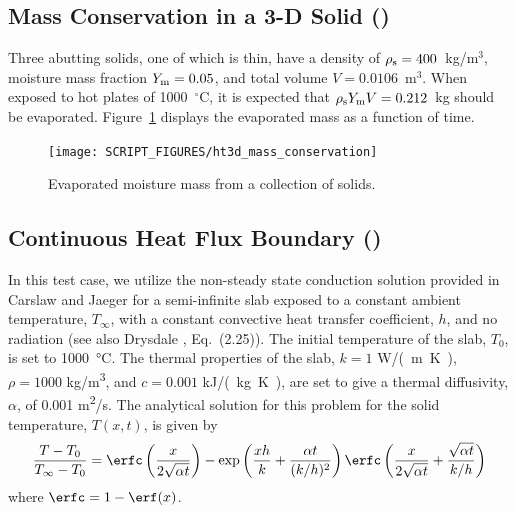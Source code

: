 \documentclass[11pt]{book}
\begin{document}
\FloatBarrier


\subsection{Mass Conservation in a 3-D Solid (\texorpdfstring{}{ht3d\_mass\_conservation})}
\label{ht3d_mass_conservation}

Three abutting solids, one of which is thin, have a density of $\rho_{\rm s}=400$~kg/m$^3$, moisture mass fraction $Y_{\rm m}=0.05$, and total volume $V=0.0106$~m$^3$. When exposed to hot plates of 1000~$^\circ$C, it is expected that $\rho_{\rm s} Y_{\rm m} V=0.212$~kg should be evaporated. Figure~\ref{fig:ht3d_mass_conservation} displays the evaporated mass as a function of time.

\begin{figure}[ht]
\centering
\texttt{[image: SCRIPT\_FIGURES/ht3d\_mass\_conservation]}
\caption[The  test case]{Evaporated moisture mass from a collection of solids.}
\label{fig:ht3d_mass_conservation}
\end{figure}

\FloatBarrier


\subsection{Continuous Heat Flux Boundary (\texorpdfstring{}{ht3d\_slab})}
\label{ht3d_slab}

In this test case, we utilize the non-steady state conduction solution provided in Carslaw and Jaeger \cite{Carslaw:1} for a semi-infinite slab exposed to a constant ambient temperature, $T_\infty$, with a constant convective heat transfer coefficient, $h$, and no radiation (see also Drysdale \cite{Drysdale:1}, Eq.~(2.25)).  The initial temperature of the slab, $T_0$, is set to \SI{1000}{\degreeCelsius}. The thermal properties of the slab, $k=1$ \si{W/(m.K)}, $\rho=1000$ \si{kg/m^3}, and $c=0.001$ \si{kJ/(kg.K)}, are set to give a thermal diffusivity, $\alpha$, of 0.001 \si{m^2/s}. The analytical solution for this problem for the solid temperature, $T(x,t)$, is given by
\begin{equation}
\label{eq:semiinfslab}
\frac{T - T_0}{T_\infty - T_0} = \erfc\left(\frac{x}{2\sqrt{\alpha t}}\right) - \exp\left( \frac{xh}{k} + \frac{\alpha t}{(k/h)^2} \right) \erfc\left( \frac{x}{2\sqrt{\alpha t}} + \frac{\sqrt{\alpha t}}{k/h} \right)
\end{equation}
where $\erfc = 1 - \erf(x)$.
\end{document}

